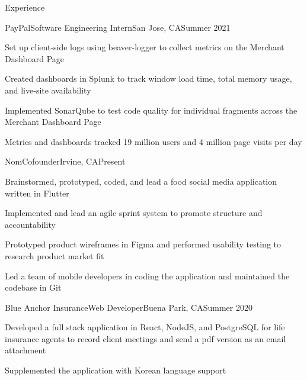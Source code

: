 \documentclass{article}
\newlength{\tabin}
\newlength{\secsep}
\newcommand{\lineunder}{\vspace*{-8pt} \\ \hspace*{-6pt} \hrulefill \\ \vspace*{-15pt}}
\newenvironment{tabbedsection}[1]{
  \begin{list}{}{
      \setlength{\itemsep}{0pt}
      \setlength{\labelsep}{0pt}
      \setlength{\labelwidth}{0pt}
      \setlength{\leftmargin}{\tabin}
      \setlength{\rightmargin}{\tabin}
      \setlength{\listparindent}{0pt}
      \setlength{\parsep}{0pt}
      \setlength{\parskip}{0pt}
      \setlength{\partopsep}{0pt}
      \setlength{\topsep}{#1}
    }
  \item[]
}{\end{list}}
\newenvironment{resume_section}[1]{
  \filbreak
  \vspace{2\secsep}
  \textsc{\large#1}
  \lineunder
  \begin{tabbedsection}{\secsep}
}{\end{tabbedsection}}
\newenvironment{subitems}{
  \renewcommand{\labelitemi}{-}
  \begin{itemize}
      \setlength{\labelsep}{1em}
}{\end{itemize}}
\newenvironment{resume_employer}[4]{
  \vspace{\secsep}
  \textbf{#1} \\ 
  \indent {\small #2} \hfill {\footnotesize#3 (#4)}
  \begin{tabbedsection}{0pt}
  \begin{subitems}
}{\end{subitems}\end{tabbedsection}}
\begin{document}
\begin{resume_section}{Experience}
  \begin{resume_employer}{PayPal}{Software Engineering Intern}{San Jose, CA}{Summer 2021}
    \item Set up client-side logs using beaver-logger to collect metrics on the Merchant Dashboard Page
    \item Created dashboards in Splunk to track window load time, total memory usage, and live-site availability
    \item Implemented SonarQube to test code quality for individual fragments across the Merchant Dashboard Page
    \item Metrics and dashboards tracked 19 million users and 4 million page visits per day
  \end{resume_employer}
   \begin{resume_employer}{Nom}{Cofounder}{Irvine, CA}{Present}
    \item Brainstormed, prototyped, coded, and lead a food social media application written in Flutter
    \item Implemented and lead an agile sprint system to promote structure and accountability
    \item Prototyped product wireframes in Figma and performed usability testing to research product market fit
    \item Led a team of mobile developers in coding the application and maintained the codebase in Git
  \end{resume_employer}
  \begin{resume_employer}{Blue Anchor Insurance}{Web Developer}{Buena Park, CA}{Summer 2020}
    \item Developed a full stack application in React, NodeJS, and PostgreSQL for life insurance agents to record client meetings and send a pdf version as an email attachment
    \item Supplemented the application with Korean language support
  \end{resume_employer}
\end{resume_section}
\end{document}
